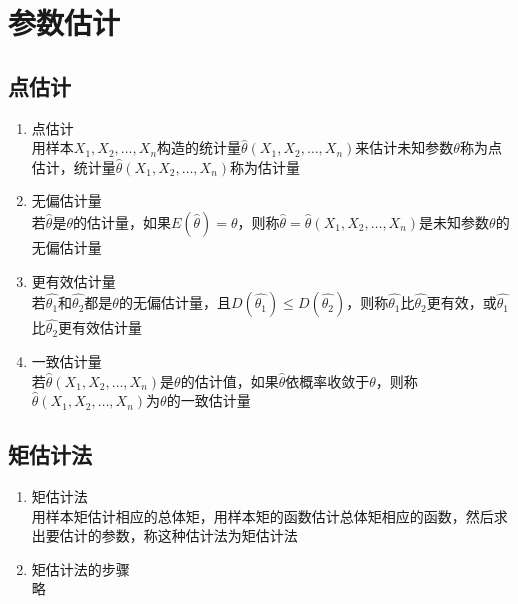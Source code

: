 \section{参数估计}
\subsection{点估计}
\begin{enumerate}
	\item 点估计 \\
	用样本$X_1, X_2, \dots, X_n$构造的统计量$\hat{\theta}(X_1, X_2, \dots, X_n)$来估计未知参数$\theta$称为点估计，统计量$\hat{\theta}(X_1, X_2, \dots, X_n)$称为估计量
	\item 无偏估计量 \\
	若$\hat{\theta}$是$\theta$的估计量，如果$E(\hat{\theta})=\theta$，则称$\hat{\theta} = \hat{\theta}(X_1, X_2, \dots, X_n)$是未知参数$\theta$的无偏估计量
	\item 更有效估计量 \\
	若$\hat{\theta_1}$和$\hat{\theta_2}$都是$\theta$的无偏估计量，且$D(\hat{\theta_1})\leq D(\hat{\theta_2})$，则称$\hat{\theta_1}$比$\hat{\theta_2}$更有效，或$\hat{\theta_1}$比$\hat{\theta_2}$更有效估计量
	\item 一致估计量 \\
	若$\hat{\theta}(X_1, X_2, \dots, X_n)$是$\theta$的估计值，如果$\hat{\theta}$依概率收敛于$\theta$，则称$\hat{\theta}(X_1, X_2, \dots, X_n)$为$\theta$的一致估计量
\end{enumerate}

\subsection{矩估计法}
\begin{enumerate}
	\item 矩估计法 \\
	用样本矩估计相应的总体矩，用样本矩的函数估计总体矩相应的函数，然后求出要估计的参数，称这种估计法为矩估计法
	\item 矩估计法的步骤 \\
	略
\end{enumerate}

